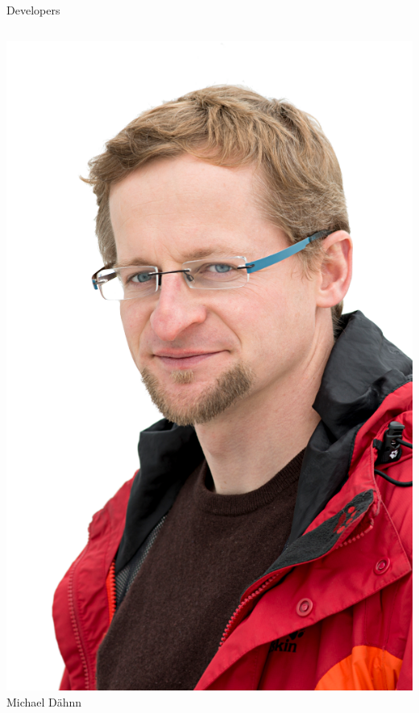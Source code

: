 \documentclass[14pt,c]{beamer}
\begin{document}
\begin{frame}{Developers}

\begin{columns}[t]
\vspace{10px}
    \begin{center}
      \includegraphics[width=\linewidth]{figure/michael} \\
      Michael D\"ahnn
    \end{center}


\end{columns}
\end{frame}
\end{document}
